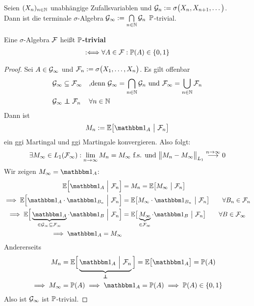 \begin{theorem}\label{theorem5.6Kolmogorovs01Gesetz}\enter
Seien $(X_n)_{n\in\N}$ unabhängige Zufallsvariablen und $\G_n:=\sigma\big(X_n,X_{n+1},\ldots\big)$.\\
Dann ist die terminale $\sigma$-Algebra
$\G_\infty:=\bigcap\limits_{n\in\N}\G_n$ $\P$-trivial.
\end{theorem}

\begin{bemerkung}
Eine $\sigma$-Algebra $\F$ heißt \textbf{$\P$-trivial}
\begin{align*}
:\Longleftrightarrow\forall A\in\F:\P(A)\in\lbrace0,1\rbrace
\end{align*}
\end{bemerkung}

\begin{proof}
Sei $A\in\G_\infty$ und $\F_n:=\sigma\big(X_1,\ldots,X_n\big)$. Es gilt offenbar 
\begin{align*}
	\G_\infty&\subseteq\F_\infty&&\text{,denn }\G_\infty=\bigcap\limits_{n\in\N}\G_n\text{ und }\F_\infty=\bigcup\limits_{n\in\N}\F_n\\
	\G_\infty&\unab\F_n&&\forall n\in\N
\end{align*}
Dann ist
\begin{align*}
M_n:=\E\big[\indi_A~\big|~\F_n\big]
\end{align*}
ein ggi Martingal und ggi Martingale konvergieren. Also folgt:
\begin{align*}
	\exists M_\infty\in L_1(\F_\infty):\limn M_n=M_\infty\text{ f.s. und }\big\Vert M_n-M_\infty\big\Vert_{L_1}\stackrel{n\to\infty}{\longrightarrow}0
\end{align*}
Wir zeigen $M_\infty=\indi_A$:
\begin{align*}
\E\Big[\indi_A~\Big|~\F_n\Big]&=M_n=\E\big[M_\infty~\big|~\F_n\big]\\
\implies
\E\Big[\indi_A\cdot\indi_{B_n}~\Big|~\F_n\Big]
&=\E\big[M_\infty\cdot\indi_{B_n}~\big|~\F_n\big]\qquad\forall B_n\in\F_n\\
\implies
\E\Big[\underbrace{\indi_A}_{\in\G_\infty\subseteq\F_\infty}\cdot\indi_{B}~\Big|~\F_n\Big]
&=\E\big[\underbrace{M_\infty}_{\in\F_\infty}\cdot\indi_{B}~\big|~\F_n\big]\qquad\forall B\in\F_\infty\\
\implies\indi_A=M_\infty
\end{align*}
Andererseits
\begin{align*}
M_n
&=\E\Big[\underbrace{\indi_A~\Big|~\F_n}_{\unab}\Big]
=\E\big[\indi_A\big]
=\P(A)\\
\implies M_\infty&=\P(A)\implies\indi_A=\P(A)
\implies\P(A)\in\lbrace0,1\rbrace
\end{align*}
Also ist $\G_\infty$ ist $\P$-trivial.
\end{proof}

